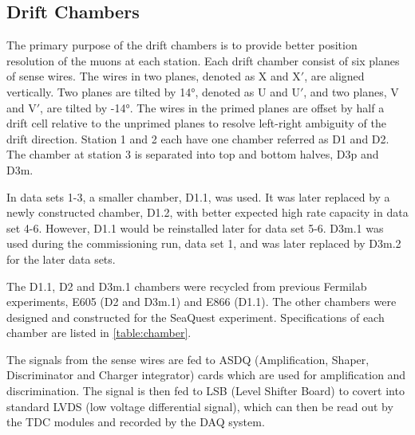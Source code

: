\documentclass[../main.tex]{subfiles}
\begin{document}
\subsection{Drift Chambers}
The primary purpose of the drift chambers is to provide better position resolution of the muons
at each station. Each drift chamber consist of six planes of sense wires. The wires in two planes,
denoted as X and X$'$, are aligned vertically. Two planes are tilted by \ang[retain-explicit-plus]{+14},
denoted as U and U$'$, and two planes, V and V$'$, are tilted by \ang[retain-explicit-plus]{-14}. The wires
in the primed planes are offset by half a drift cell relative to the unprimed planes to resolve left-right ambiguity of the
drift direction. Station 1 and 2 each have one chamber referred as D1 and D2. The chamber at station
3 is separated into top and bottom halves, D3p and D3m.

In data sets 1-3, a smaller chamber, D1.1, was used. It was later replaced by a newly constructed
chamber, D1.2, with better expected high rate capacity in data set 4-6. However, D1.1 would be
reinstalled later for data set 5-6. D3m.1 was used during the commissioning run, data set 1, and
was later replaced by D3m.2 for the later data sets.

The D1.1, D2 and D3m.1 chambers were recycled from previous Fermilab experiments, E605 (D2 and D3m.1)
and E866 (D1.1). The other chambers were designed and constructed for the SeaQuest experiment.
Specifications of each chamber are listed in \cref{table:chamber}.

The signals from the sense wires are fed to ASDQ (Amplification, Shaper, Discriminator and Charger integrator)
cards which are used for amplification and discrimination. The signal is then fed to LSB (Level Shifter Board)
to covert into standard LVDS (low voltage differential signal), which can then be read out by the TDC
modules and recorded by the DAQ system.
\end{document}
